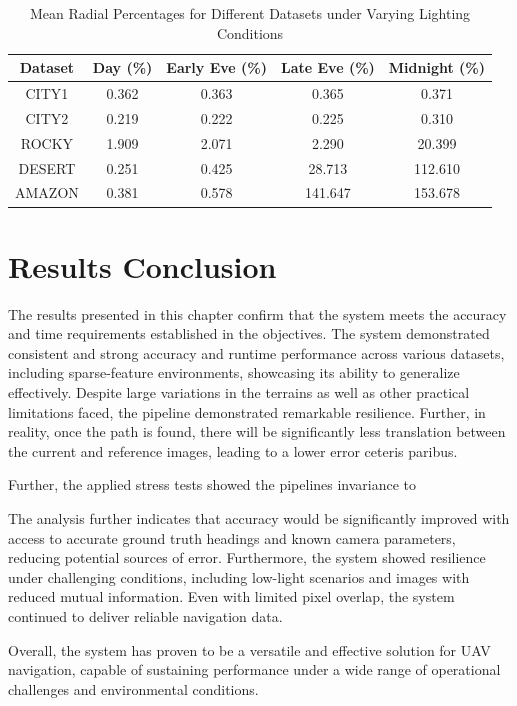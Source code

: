 \begin{table}[H]
    \centering
    \begin{tabular}{|c|c|c|c|c|}
    \hline
    \textbf{Dataset} & \textbf{Day (\%)} & \textbf{Early Eve (\%)} & \textbf{Late Eve (\%)} & \textbf{Midnight (\%)} \\
    \hline
    CITY1 & 0.362 & 0.363 & 0.365 & 0.371 \\
    CITY2 & 0.219 & 0.222 & 0.225 & 0.310 \\
    ROCKY & 1.909 & 2.071 & 2.290 & 20.399 \\
    DESERT & 0.251 & 0.425 & 28.713 & 112.610 \\
    AMAZON & 0.381 & 0.578 & 141.647 & 153.678 \\
    \hline
    \end{tabular}
    \caption{Mean Radial Percentages for Different Datasets under Varying Lighting Conditions}
    \label{tab:mean_radial_percent}
    \end{table}
    



    

\section{Results Conclusion}

The results presented in this chapter confirm that the system meets the accuracy and time requirements established in the objectives. The system demonstrated consistent and strong accuracy and runtime performance across various datasets, including sparse-feature environments, showcasing its ability to generalize effectively. Despite large variations in the terrains as well as other practical limitations faced, the pipeline demonstrated remarkable resilience. Further, in reality, once the path is found, there will be significantly less translation between the current and reference images, leading to a lower error ceteris paribus.


Further, the applied stress tests showed the pipelines invariance to 

The analysis further indicates that accuracy would be significantly improved with access to accurate ground truth headings and known camera parameters, reducing potential sources of error. Furthermore, the system showed resilience under challenging conditions, including low-light scenarios and images with reduced mutual information. Even with limited pixel overlap, the system continued to deliver reliable navigation data.

Overall, the system has proven to be a versatile and effective solution for UAV navigation, capable of sustaining performance under a wide range of operational challenges and environmental conditions.

